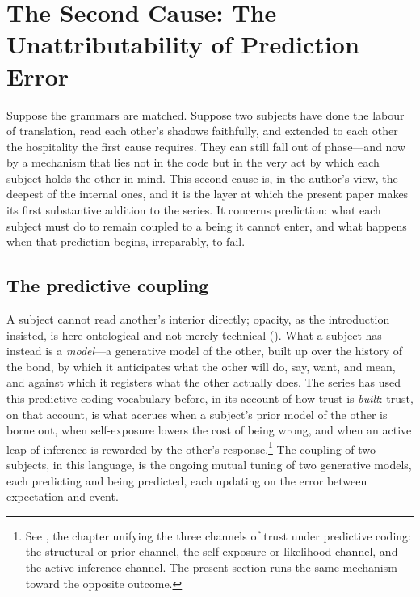 \section{The Second Cause: The Unattributability of Prediction Error}
\label{p17:sec:prediction}

\noindent
Suppose the grammars are matched. Suppose two subjects have done the labour of translation, read each other's shadows faithfully, and extended to each other the hospitality the first cause requires. They can still fall out of phase---and now by a mechanism that lies not in the code but in the very act by which each subject holds the other in mind. This second cause is, in the author's view, the deepest of the internal ones, and it is the layer at which the present paper makes its first substantive addition to the series. It concerns prediction: what each subject must do to remain coupled to a being it cannot enter, and what happens when that prediction begins, irreparably, to fail.

\subsection{The predictive coupling}
\label{p17:sub:prediction-coupling}

A subject cannot read another's interior directly; opacity, as the introduction insisted, is here ontological and not merely technical (). What a subject has instead is a \emph{model}---a generative model of the other, built up over the history of the bond, by which it anticipates what the other will do, say, want, and mean, and against which it registers what the other actually does. The series has used this predictive-coding vocabulary before, in its account of how trust is \emph{built}: trust, on that account, is what accrues when a subject's prior model of the other is borne out, when self-exposure lowers the cost of being wrong, and when an active leap of inference is rewarded by the other's response.\footnote{See \textcite{paperxiii}, the chapter unifying the three channels of trust under predictive coding: the structural or prior channel, the self-exposure or likelihood channel, and the active-inference channel. The present section runs the same mechanism toward the opposite outcome.} The coupling of two subjects, in this language, is the ongoing mutual tuning of two generative models, each predicting and being predicted, each updating on the error between expectation and event.

